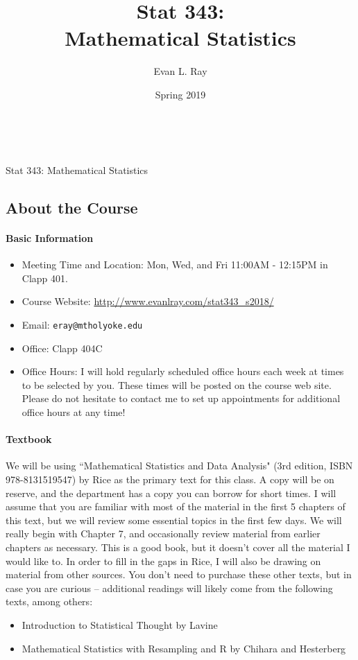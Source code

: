 \documentclass[11pt]{article}
\title{Stat 343:\\Mathematical Statistics}
\author{Evan L. Ray}
\date{Spring 2019}
\begin{document}

\ \\
\vspace{.01in}
\begin{center}
{\large Stat 343: Mathematical Statistics}
\end{center}
\subsection*{About the Course}

\paragraph{Basic Information}  

\begin{itemize}
 \item Meeting Time and Location: Mon, Wed, and Fri 11:00AM - 12:15PM in Clapp 401.
 \item Course Website: \url{http://www.evanlray.com/stat343_s2018/}
 \item Email: \texttt{eray@mtholyoke.edu}
 \item Office: Clapp 404C
 \item Office Hours: I will hold regularly scheduled office hours each week at times to be selected by you.  These times will be posted on the course web site.  Please do not hesitate to contact me to set up appointments for additional office hours at any time!
\end{itemize}

\paragraph{Textbook}

We will be using ``Mathematical Statistics and Data Analysis" (3rd edition, ISBN 978-8131519547) by Rice as the primary text for this class.  A copy will be on reserve, and the department has a copy you can borrow for short times.  I will assume that you are familiar with most of the material in the first 5 chapters of this text, but we will review some essential topics in the first few days.  We will really begin with Chapter 7, and occasionally review material from earlier chapters as necessary.  This is a good book, but it doesn't cover all the material I would like to.  In order to fill in the gaps in Rice, I will also be drawing on material from other sources.  You don't need to purchase these other texts, but in case you are curious -- additional readings will likely come from the following texts, among others:
\begin{itemize}
\item Introduction to Statistical Thought by Lavine
\item Mathematical Statistics with Resampling and R by Chihara and Hesterberg
\end{itemize}
\end{document}
